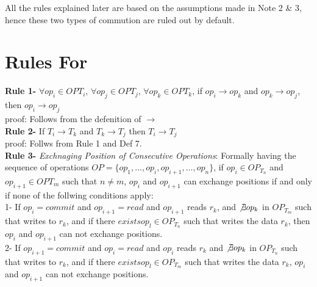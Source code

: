 \documentclass[a4paper, 11pt]{article}
\begin{document}
All the rules explained later are based on the assumptions made in Note 2 \& 3, hence these two types of commution are ruled out by default.\\




\section{Rules For }

\textbf{Rule 1-} $\forall op_i \in  OP{T_i}$, $\forall op_j \in  OP{T_j}$, $\forall op_k \in  OP{T_k}$, if $op_i \rightarrow op_k$ and  $op_k \rightarrow op_j$, then $op_i \rightarrow op_j$ \\

proof: Follows from the defenition of $\rightarrow$ \\


\textbf{Rule 2-} If $T_i \rightarrow T_k$ and $T_k \rightarrow T_j$ then $T_i \rightarrow T_j$ \\

proof: Follws from Rule 1 and Def 7. \\ 

\textbf{Rule 3-} \emph{Exchnaging Position of Consecutive Operations}: Formally having the sequence of operations $OP = \{op_1,...,op_i,op_{i+1},...,op_n\}$, if $op_i \in OP_{T_n}$ and $op_{i+1} \in OP{T_m}$ such that $ n\neq m$, $op_i$ and $op_{i+1}$ can exchange positions if and only if none of the follwing conditions apply:\\

\hspace{8mm} 1- If $op_i = {commit}$ and $op_{i+1} = {read}$ and $op_{i+1}$ reads $r_k$, and $\not \exists op_k$ in $OP_{T_m}$ such that writes to $r_k$, and if there  $exists op_l \in OP_{T_n}$ such that writes the data $r_k$, then $op_i$ and $op_{i+1}$ can not exchange positions.\\ 

\hspace{8mm} 2- If $op_{i+1} = {commit}$ and $op_{i} = {read}$ and $op_{i}$ reads $r_k$ and $\not \exists op_k$ in $OP_{T_n}$ such that writes to $r_k$, and if there $exists op_l \in OP_{T_m}$ such that writes the data $r_k$, $op_i$ and $op_{i+1}$ can not exchange positions.\\ 
\end{document}
